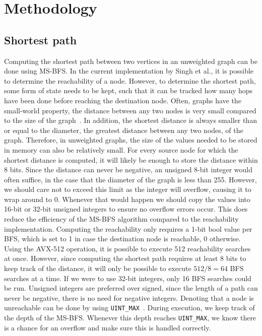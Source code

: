 \section{Methodology}\label{sec:method}
\subsection{Shortest path}
Computing the shortest path between two vertices in an unweighted graph can be done using MS-BFS. 
In the current implementation by Singh et al., it is possible to determine the reachability of a node. 
However, to determine the shortest path, some form of state needs to be kept, such that it can be tracked how many hops have been done before reaching the destination node. 
Often, graphs have the small-world property, the distance between any two nodes is very small compared to the size of the graph~\cite{10.14778/2735496.2735507}. 
In addition, the shortest distance is always smaller than or equal to the diameter, the greatest distance between any two nodes, of the graph.
Therefore, in unweighted graphs, the size of the values needed to be stored in memory can also be relatively small. 
For every source node for which the shortest distance is computed, it will likely be enough to store the distance within 8 bits. 
Since the distance can never be negative, an unsigned 8-bit integer would often suffice, in the case that the diameter of the graph is less than 255. 
However, we should care not to exceed this limit as the integer will overflow, causing it to wrap around to 0. 
Whenever that would happen we should copy the values into 16-bit or 32-bit unsigned integers to ensure no overflow errors occur.
This does reduce the efficiency of the MS-BFS algorithm compared to the reachability implementation. 
Computing the reachability only requires a 1-bit bool value per BFS, which is set to 1 in case the destination node is reachable, 0 otherwise. 
Using the AVX-512 operation, it is possible to execute 512 reachability searches at once. 
However, since computing the shortest path requires at least 8 bits to keep track of the distance, it will only be possible to execute $512/8 = 64$ BFS searches at a time. 
If we were to use 32-bit integers, only 16 BFS searches could be run.
Unsigned integers are preferred over signed, since the length of a path can never be negative, there is no need for negative integers. Denoting that a node is unreachable can be done by using \texttt{UINT\_MAX}~\cite{uint-max}. During execution, we keep track of the depth of the MS-BFS. Whenever this depth reaches \texttt{UINT\_MAX}, we know there is a chance for an overflow and make sure this is handled correctly.

